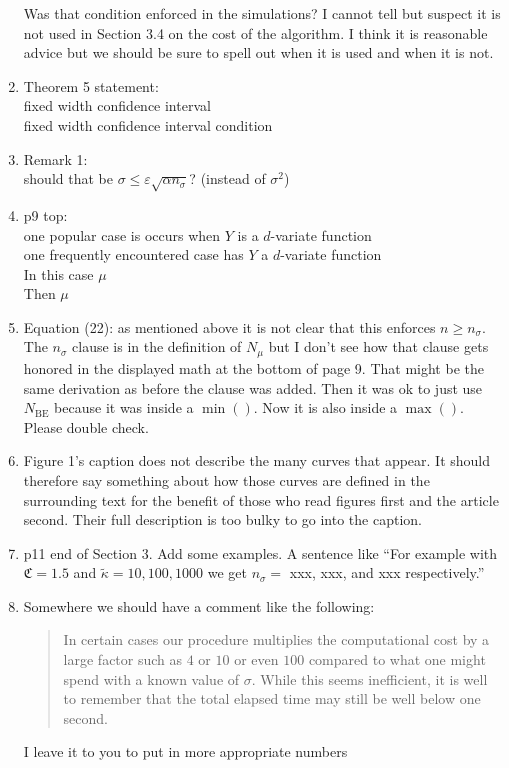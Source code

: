 \documentclass{article}
\newcommand{\fudge}{\mathfrak{C}}
\begin{document}
\begin{enumerate}
Was that condition enforced in the simulations?
I cannot tell but suspect it is not used in 
Section 3.4 on the cost of the algorithm.
I think it is reasonable advice but we should
be sure to spell out when it is used and when it is not.
\item
Theorem 5 statement:\\
fixed width confidence interval\\
fixed width confidence interval condition
\item
Remark 1:\\
should that be $\sigma \le \varepsilon\sqrt{\alpha n_\sigma}$?
(instead of $\sigma^2$)
\item
p9 top:\\
one popular case is occurs when $Y$ is a $d$-variate function\\
one frequently encountered case has $Y$ a $d$-variate function\\
In this case $\mu$\\
Then $\mu$
\item
Equation (22): as mentioned above it is
not clear that this enforces $n\ge n_\sigma$.
The $n_\sigma$ clause is in the definition of $N_\mu$
but I don't see how that clause gets honored
in the displayed math at the bottom of page 9.
That might be the same derivation as before the
clause was added. Then it was ok to just
use $N_{\text{BE}}$ because it was inside a $\min()$.
Now it is also inside a $\max()$. Please double check. 
\item
Figure 1's caption does not describe the many curves
that appear. It should therefore say something about
how those curves are defined in the surrounding text
for the benefit of those who read figures first and
the article second. 
Their full description is too bulky to go into the
caption.
\item
p11 end of Section 3.  Add some examples. A sentence
like
``For example with 
$\fudge = 1.5$ and 
$\tilde \kappa = 10, 100, 1000$
we get $n_\sigma = $ xxx, xxx, and xxx respectively.''
\item
Somewhere we should have a comment like the following:
\begin{quote}
In certain cases our procedure multiplies the
computational cost by a large factor such as $4$ or
$10$ or even $100$ compared to what one might
spend with a known value of $\sigma$. 
While this seems inefficient, it is
well to remember that the total elapsed time may still be
well below one second.
\end{quote}
I leave it to you to put in more appropriate numbers

\end{enumerate}
\end{document}
